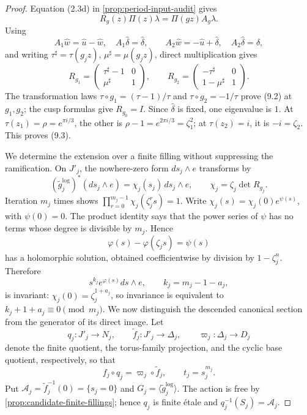 \begin{proof}
Equation (2.3d) in \cref{prop:period-input-audit} gives
\[
 R_g(z)\Pi(z)\lambda=\Pi(gz)A_g\lambda.
\]
Using
\[
 A_1\widehat w=\widehat u-\widehat w,\quad
 A_1\widehat\delta=\widehat\delta,\qquad
 A_2\widehat w=-\widehat u+\widehat\delta,\quad
 A_2\widehat\delta=\widehat\delta,
\]
and writing \(\tau^\sharp=\tau(g_jz)\),
\(\mu^\sharp=\mu(g_jz)\), direct multiplication gives
\[
 R_{g_1}=
 \begin{pmatrix}\tau^\sharp-1&0\\ \mu^\sharp&1\end{pmatrix},
 \qquad
 R_{g_2}=
 \begin{pmatrix}-\tau^\sharp&0\\1-\mu^\sharp&1\end{pmatrix}.
\]
The transformation laws
\(\tau\circ g_1=(\tau-1)/\tau\) and
\(\tau\circ g_2=-1/\tau\) prove (9.2) at \(g_1,g_2\); the cusp formulas
give \(R_{g_0}=I\).  Since \(\widehat\delta\) is fixed, one eigenvalue is
\(1\).  At \(\tau(z_1)=\rho=e^{\pi i/3}\), the other is
\(\rho-1=e^{2\pi i/3}=\zeta_1^2\); at \(\tau(z_2)=i\), it is
\(-i=\zeta_2\).  This proves (9.3).

We determine the extension over a finite filling without suppressing the
ramification.  On \(J'_j\), the nowhere-zero form \(ds_j\wedge e\)
transforms by
\[
 (\widetilde g_j^{\log})^*(ds_j\wedge e)
 =\chi_j(s_j)\,ds_j\wedge e,
 \qquad \chi_j=\zeta_j\det R_{g_j}.
\tag{9.4}
\]
Iteration \(m_j\) times shows
\(\prod_{r=0}^{m_j-1}\chi_j(\zeta_j^rs)=1\).
Write \(\chi_j(s)=\chi_j(0)e^{\psi(s)}\), with \(\psi(0)=0\).
The product identity says that the power series of \(\psi\) has no terms
whose degree is divisible by \(m_j\).  Hence
\[
 \varphi(s)-\varphi(\zeta_js)=\psi(s)
\]
has a holomorphic solution, obtained coefficientwise by division by
\(1-\zeta_j^n\).  Therefore
\[
 s^{k_j}e^{\varphi(s)}ds\wedge e,
 \qquad k_j=m_j-1-a_j,
\tag{9.5}
\]
is invariant: \(\chi_j(0)=\zeta_j^{1+a_j}\), so invariance is equivalent
to \(k_j+1+a_j\equiv0\pmod {m_j}\).  We now distinguish the descended
canonical section from the generator of its direct image.  Let
\[
 q_j:J'_j\longrightarrow N_j,\qquad
 \widetilde f_j:J'_j\longrightarrow\Delta_j,\qquad
 \varpi_j:\Delta_j\longrightarrow D_j
\]
denote the finite quotient, the torus-family projection, and the cyclic base
quotient, respectively, so that
\[
 f_j\circ q_j=\varpi_j\circ\widetilde f_j,
 \qquad t_j=s_j^{m_j}.
\]
Put \(\mathcal A_j=\widetilde f_j^{-1}(0)=\{s_j=0\}\) and
\(G_j=\langle\widetilde g_j^{\log}\rangle\).  The action is free by
\cref{prop:candidate-finite-fillings}; hence \(q_j\) is finite \'etale
and \(q_j^{-1}(S_j)=\mathcal A_j\).


\end{proof}
